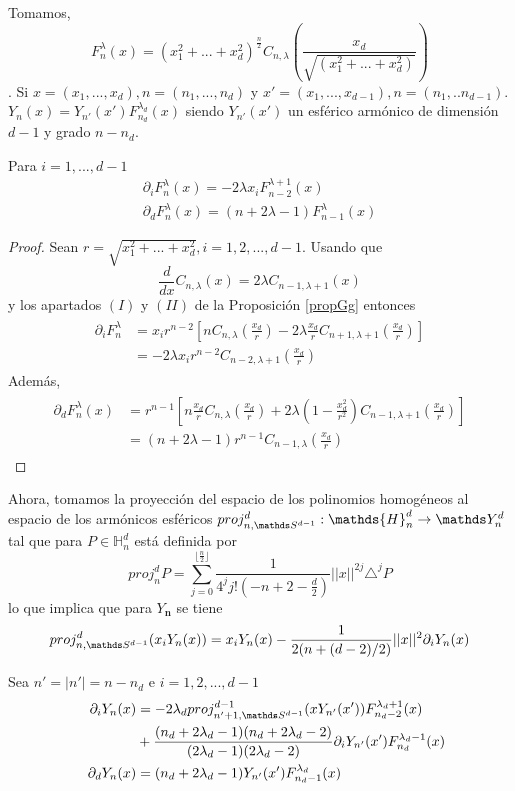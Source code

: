 Tomamos, $$F_n^\lambda (x) = (x_1^2+...+x_d^2)^{\frac{n}{2}}C_{n,\lambda}\left(\frac{x_d}{\sqrt{(x_1^2+...+x_d^2)}}\right)$$.
Si $x=(x_1,...,x_d), n=(n_1,...,n_d)$ y $x' = (x_1,...,x_{d-1}), n=(n_1,..n_{d-1})$.
$Y_n(x) = Y_{n'}(x') F_{n_d}^{\lambda_d} (x)$ siendo $ Y_{n'}(x')$ un esférico armónico de dimensión $d-1$ y grado $n-n_d$.
\begin{prop}Para $i=1,...,d-1$
	\begin{gather*}
	\partial_i  F_{n}^\lambda(x) = -2\lambda x_i F_{n-2}^{\lambda+1}(x) \\ 
	\partial_d F_{n}^{\lambda}(x) = (n+2\lambda-1)  F_{n-1}^{\lambda}(x)
	\end{gather*}
\end{prop}
\begin{proof}
	Sean $r=\sqrt{x_1^2+...+x_d^2},i=1,2,...,d-1$. Usando que $$\frac{d}{dx}C_{n,\lambda}(x) = 2\lambda C_{n-1,\lambda+1}(x)$$ y los apartados $(I)$ y $(II)$ de la Proposición \ref{propGg} entonces
	\begin{gather*}
	\begin{aligned}
	\partial_i F_{n}^{\lambda} &= x_i r^{n-2} \left[ n C_{n,\lambda}(\frac{x_d}{r})-2\lambda\frac{x_d}{r}C_{n+1,\lambda+1}(\frac{x_d}{r})\right] \\&= -2\lambda x_ir^{n-2}C_{n-2,\lambda+1}(\frac{x_d}{r})
	\end{aligned}
	\end{gather*}
	Además,
	\begin{gather*}
		\begin{aligned}
		\partial_d F_{n}^{\lambda}(x) &= r^{n-1}\left[n\frac{x_d}{r}C_{n,\lambda}(\frac{x_d}{r})+2\lambda(1-\frac{x_d^2}{r^2})C_{n-1,\lambda+1}(\frac{x_d}{r})\right] \\&= (n+2\lambda-1)r^{n-1}C_{n-1,\lambda}(\frac{x_d}{r})		
		\end{aligned}
	\end{gather*}
	
	
\end{proof}
Ahora, tomamos la proyección del espacio de los polinomios homogéneos al espacio de los armónicos esféricos $proj_{n,\sphere}^d : \mathds{H}_n^d \to \spharm$ tal que para $P\in \mathds{H}_n^d$ está definida por 
$$ proj_{n}^d P = \sum_{j=0}^{\lfloor \frac{n}{2} \rfloor}\frac{1}{4^j j! (-n+2-\frac{d}{2})} ||x||^{2j} \triangle^jP
$$
lo que implica que para $Y_\textbf{n}$ se tiene
$$
proj_{n,\sphere}^d (x_iY_{n}(x)) = x_i Y_n(x)-\frac{1}{2(n+(d-2)/2)} ||x||^2 \partial_i Y_n(x)$$
\begin{prop}Sea $n'=|n'|=n-n_d$ e $i=1,2,...,d-1$
	\begin{gather*}
	\begin{aligned}
	\partial_i Y_n(x) &= -2\lambda_d proj_{n'+1,\sphere}^{d-1}(xY_{n'}(x'))F_{n_d-2}^{\lambda_d+1}(x)\\   &+\frac{(n_d+2\lambda_d-1)(n_d+2\lambda_d-2)}{(2\lambda_d-1)(2\lambda_d-2)}\partial_iY_{n'}(x')F_{n_d}^{\lambda_d-1}(x) \\ \quad
	\partial_dY_n(x) &= (n_d+2\lambda_d-1)Y_{n'}(x')F_{n_d-1}^{\lambda_d}(x)
	\end{aligned}
	\end{gather*}
\end{prop}
